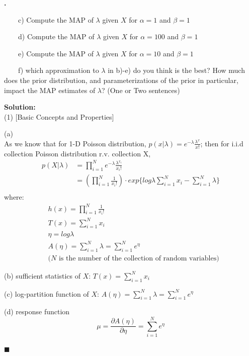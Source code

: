 \documentclass{article}
\newcounter{pcounter}                                   %
\newenvironment{problem}                                %
{                                                       %
    \stepcounter{pcounter}                              %
    \textbf{\arabic{pcounter}.}                         %
}{}                                                     %
\newenvironment{solution}                               %
{\textbf{Solution:} \\}{$\blacksquare$\newline}         %
\newcommand{\tab}{\ \ \ \ }                             %
\begin{document}
\begin{problem}
        \tab c) Compute the MAP of $\lambda$ given $X$ for $\alpha = 1$ and $\beta = 1$
        
        \tab d) Compute the MAP of $\lambda$ given $X$ for $\alpha = 100$ and $\beta = 1$
        
        \tab e) Compute the MAP of $\lambda$ given $X$ for $\alpha = 10$ and $\beta = 1$

        \tab f) which approximation to $\lambda$ in b)-e) do you think is the best? How much does the prior distribution, and parameterizations of the prior in particular, impact the MAP estimates of $\lambda$? (One or Two sentences)
    \end{problem}

    \begin{solution}
        (1) [Basic Concepts and Properties]

        (a) \\
        As we know that for 1-D Poisson distribution, $p(x | \lambda) = e^{-\lambda} \frac{\lambda^x}{x!}$; then for i.i.d collection Poisson distribution r.v. collection X,
        \begin{align*}
            p(X | \lambda) &= \prod\limits_{i=1}^{N} e^{-\lambda} \frac{\lambda^{x_i}}{x_i!} \\
            &= (\prod\limits_{i=1}^{N}{\frac{1}{x_i!}}) \cdot
               exp\{ log{\lambda}\sum\limits_{i=1}^{N}{x_i} - \sum\limits_{i=1}^{N}{\lambda} \} \\
        \end{align*}
        where:
        \begin{align*}
            & h(x) = \prod\limits_{i=1}^{N}{\frac{1}{x_i!}} \\
            & T(x) = \sum\limits_{i=1}^{N}{x_i}\\
            & \eta = log{\lambda}\\
            & A(\eta) = \sum\limits_{i=1}^{N}{\lambda} = \sum\limits_{i=1}^{N}{e^{\eta}} \\
            & \text{($N$ is the number of the collection of random variables)}
        \end{align*}

        (b) sufficient statistics of $X$: $T(x) = \sum\limits_{i=1}^{N}{x_i}$

        (c) log-partition function of $X$: $A(\eta) = \sum\limits_{i=1}^{N}{\lambda} = \sum\limits_{i=1}^{N}{e^{\eta}}$

        (d) response function
        $$
            \mu = \frac{\partial A(\eta)}{\partial \eta}
            = \sum\limits_{i=1}^{N}{e^{\eta}}
        $$


\end{solution}
\end{document}
